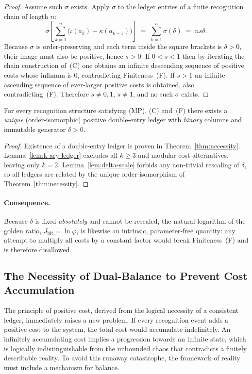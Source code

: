 \begin{proof}
Assume such \(\sigma\) exists.
Apply \(\sigma\) to the ledger entries of a finite recognition
chain of length \(n\):
\[
  \sigma\!\left[\sum_{k=1}^{n}
     \bigl(\iota(a_k)-\kappa(a_{k-1})\bigr)\right]
  \;=\;
  \sum_{k=1}^{n}
     \sigma(\delta)
  \;=\;
  ns\delta .
\]
Because \(\sigma\) is order‑preserving and each term inside the
square brackets is \(\delta>0\),
their image must also be positive, hence \(s>0\).
If \(0<s<1\) then by iterating the chain construction of (C)
one obtains an infinite descending sequence of positive costs
whose infimum is \(0\), contradicting Finiteness (F).
If \(s>1\) an infinite ascending sequence of ever‑larger positive
costs is obtained, also contradicting (F).
Therefore \(s\neq0,1\), \(s\neq1\), and no such \(\sigma\) exists.
\end{proof}

\begin{theorem}\label{thm:ledger-necessity-strong}
For every recognition structure satisfying \textnormal{(MP)}, \textnormal{(C)}
and \textnormal{(F)} there exists a \emph{unique}
(order‑isomorphic) positive double‑entry ledger with
\emph{binary} columns and immutable generator \(\delta>0\).
\end{theorem}

\begin{proof}
Existence of a double‑entry ledger is proven in Theorem~\ref{thm:necessity}.
Lemma~\ref{lem:k-ary-ledger} excludes all \(k\ge3\) and modular‑cost
alternatives, leaving only \(k=2\).
Lemma~\ref{lem:delta-scale} forbids any non‑trivial rescaling of
\(\delta\), so all ledgers are related by the unique
order‑isomorphism of Theorem~\ref{thm:necessity}.
\end{proof}

\paragraph{Consequence.}
Because \(\delta\) is fixed \emph{absolutely} and cannot be rescaled,
the natural logarithm of the golden ratio,
\(J_{\text{bit}}=\ln\varphi\),
is likewise an intrinsic, parameter‑free quantity: any attempt to
multiply all costs by a constant factor would break
Finiteness (F) and is therefore disallowed.

\subsection{The Necessity of Dual-Balance to Prevent Cost Accumulation}
The principle of positive cost, derived from the logical necessity of a consistent ledger, immediately raises a new problem. If every recognition event adds a positive cost to the system, the total cost would accumulate indefinitely. An infinitely accumulating cost implies a progression towards an infinite state, which is logically indistinguishable from the unbounded chaos that contradicts a finitely describable reality. To avoid this runaway catastrophe, the framework of reality must include a mechanism for balance.

